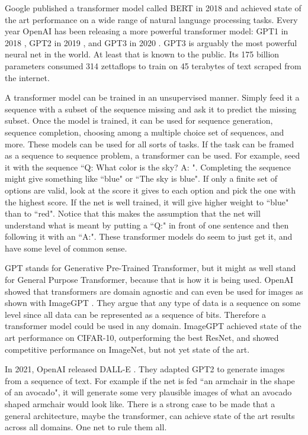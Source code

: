 Google published a transformer model called BERT in 2018 \cite{devlin2018bert} and achieved state of the art performance on a wide range of natural language processing tasks.  Every year OpenAI has been releasing a more powerful transformer model: GPT1 in 2018 \cite{radford2018improving}, GPT2 in 2019 \cite{radford2019language}, and GPT3 in 2020 \cite{brown2020language}.  GPT3 is arguably the most powerful neural net in the world.  At least that is known to the public.  Its 175 billion parameters consumed 314 zettaflops to train on 45 terabytes of text scraped from the internet.

A transformer model can be trained in an unsupervised manner.  Simply feed it a sequence with a subset of the sequence missing and ask it to predict the missing subset.  Once the model is trained, it can be used for sequence generation, sequence completion, choosing among a multiple choice set of sequences, and more.  These models can be used for all sorts of tasks.  If the task can be framed as a sequence to sequence problem, a transformer can be used.  For example, seed it with the sequence ``Q: What color is the sky? A: ".  Completing the sequence might give something like ``blue" or ``The sky is blue".  If only a finite set of options are valid, look at the score it gives to each option and pick the one with the highest score.  If the net is well trained, it will give higher weight to ``blue" than to ``red".  Notice that this makes the assumption that the net will understand what is meant by putting a ``Q:" in front of one sentence and then following it with an ``A:".  These transformer models do seem to just get it, and have some level of common sense.

GPT stands for Generative Pre-Trained Transformer, but it might as well stand for General Purpose Transformer, because that is how it is being used.  OpenAI showed that transformers are domain agnostic and can even be used for images as shown with ImageGPT \cite{chen2020generative}.  They argue that any type of data is a sequence on some level since all data can be represented as a sequence of bits.  Therefore a transformer model could be used in any domain.  ImageGPT achieved state of the art performance on CIFAR-10, outperforming the best ResNet, and showed competitive performance on ImageNet, but not yet state of the art.

In 2021, OpenAI released DALL-E \cite{ramesh2021zero}.  They adapted GPT2 to generate images from a sequence of text.  For example if the net is fed ``an armchair in the shape of an avocado", it will generate some very plausible images of what an avocado shaped armchair would look like.  There is a strong case to be made that a general architecture, maybe the transformer, can achieve state of the art results across all domains.  One net to rule them all. \\

